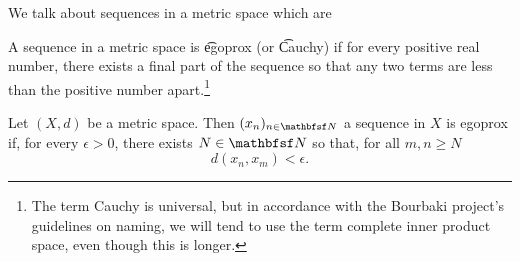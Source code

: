 

We talk about sequences in a metric space which are 


A sequence in a metric space is \t{egoprox} (or \t{Cauchy}) if for every positive real number, there exists a final part of the sequence so that any two terms are less than the positive number apart.\footnote{The term Cauchy is universal, but in accordance with the Bourbaki project's guidelines on naming, we will tend to use the term complete inner product space, even though this is longer.}


Let $(X, d)$ be a metric space.
Then $(x_n)_{n \in \N}$ a sequence in $X$ is egoprox if, for every $\epsilon > 0$, there exists $N \in \N$ so that, for all $m, n \geq N$
\[
  d(x_n, x_m) < \epsilon.
\]

\blankpage
